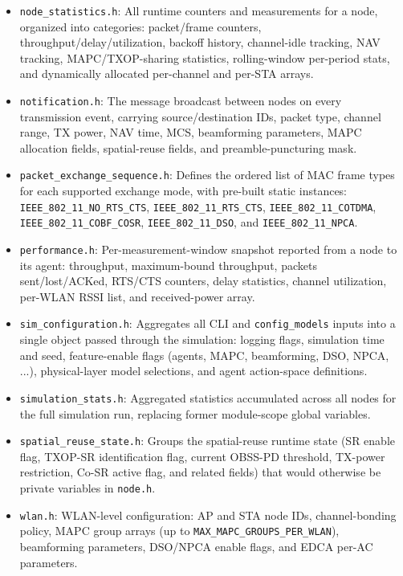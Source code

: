\documentclass[11pt,a4paper]{article}
\begin{document}
\begin{itemize}
    \item \texttt{node\_statistics.h}: All runtime counters and measurements for a node, organized into categories: packet/frame counters, throughput/delay/utilization, backoff history, channel-idle tracking, NAV tracking, MAPC/TXOP-sharing statistics, rolling-window per-period stats, and dynamically allocated per-channel and per-STA arrays.
    \item \texttt{notification.h}: The message broadcast between nodes on every transmission event, carrying source/destination IDs, packet type, channel range, TX power, NAV time, MCS, beamforming parameters, MAPC allocation fields, spatial-reuse fields, and preamble-puncturing mask.
    \item \texttt{packet\_exchange\_sequence.h}: Defines the ordered list of MAC frame types for each supported exchange mode, with pre-built static instances: \texttt{IEEE\_802\_11\_NO\_RTS\_CTS}, \texttt{IEEE\_802\_11\_RTS\_CTS}, \texttt{IEEE\_802\_11\_COTDMA}, \texttt{IEEE\_802\_11\_COBF\_COSR}, \texttt{IEEE\_802\_11\_DSO}, and \texttt{IEEE\_802\_11\_NPCA}.
    \item \texttt{performance.h}: Per-measurement-window snapshot reported from a node to its agent: throughput, maximum-bound throughput, packets sent/lost/ACKed, RTS/CTS counters, delay statistics, channel utilization, per-WLAN RSSI list, and received-power array.
    \item \texttt{sim\_configuration.h}: Aggregates all CLI and \texttt{config\_models} inputs into a single object passed through the simulation: logging flags, simulation time and seed, feature-enable flags (agents, MAPC, beamforming, DSO, NPCA, ...), physical-layer model selections, and agent action-space definitions.
    \item \texttt{simulation\_stats.h}: Aggregated statistics accumulated across all nodes for the full simulation run, replacing former module-scope global variables.
    \item \texttt{spatial\_reuse\_state.h}: Groups the spatial-reuse runtime state (SR enable flag, TXOP-SR identification flag, current OBSS-PD threshold, TX-power restriction, Co-SR active flag, and related fields) that would otherwise be private variables in \texttt{node.h}.
    \item \texttt{wlan.h}: WLAN-level configuration: AP and STA node IDs, channel-bonding policy, MAPC group arrays (up to \texttt{MAX\_MAPC\_GROUPS\_PER\_WLAN}), beamforming parameters, DSO/NPCA enable flags, and EDCA per-AC parameters.
\end{itemize}
\end{document}
